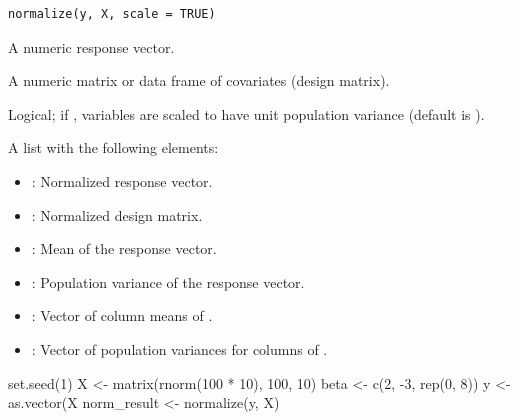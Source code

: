 \documentclass[a4paper]{book}
\begin{document}
%
\begin{Usage}
\begin{verbatim}
normalize(y, X, scale = TRUE)
\end{verbatim}
\end{Usage}
%
\begin{Arguments}
\begin{ldescription}
\item[\code{y}] A numeric response vector.

\item[\code{X}] A numeric matrix or data frame of covariates (design matrix).

\item[\code{scale}] Logical; if , variables are scaled to have unit population variance (default is ).
\end{ldescription}
\end{Arguments}
%
\begin{Value}
A list with the following elements:
\begin{itemize}

\item{} : Normalized response vector.
\item{} : Normalized design matrix.
\item{} : Mean of the response vector.
\item{} : Population variance of the response vector.
\item{} : Vector of column means of .
\item{} : Vector of population variances for columns of .

\end{itemize}

\end{Value}
%
\begin{Examples}
\begin{ExampleCode}
set.seed(1)
X <- matrix(rnorm(100 * 10), 100, 10)
beta <- c(2, -3, rep(0, 8))
y <- as.vector(X %
norm_result <- normalize(y, X)

\end{ExampleCode}
\end{Examples}
\printindex{}
\end{document}
